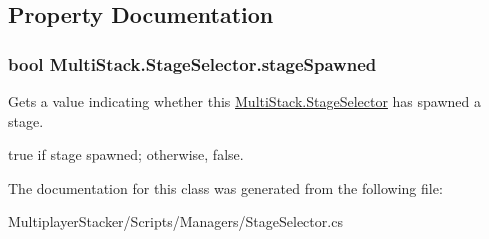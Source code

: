 \subsection{Property Documentation}
\hypertarget{class_multi_stack_1_1_stage_selector_a72499a1e9a675f0fc6d2923d4c1daf51}{}
\subsubsection[{stage\+Spawned}]{\setlength{\rightskip}{0pt plus 5cm}bool Multi\+Stack.\+Stage\+Selector.\+stage\+Spawned\hspace{0.3cm}{\ttfamily [get]}}\label{class_multi_stack_1_1_stage_selector_a72499a1e9a675f0fc6d2923d4c1daf51}


Gets a value indicating whether this \hyperlink{class_multi_stack_1_1_stage_selector}{Multi\+Stack.\+Stage\+Selector} has spawned a stage. 

{\ttfamily true} if stage spawned; otherwise, {\ttfamily false}.

The documentation for this class was generated from the following file\+:\begin{DoxyCompactItemize}
\item 
Multiplayer\+Stacker/\+Scripts/\+Managers/Stage\+Selector.\+cs\end{DoxyCompactItemize}
